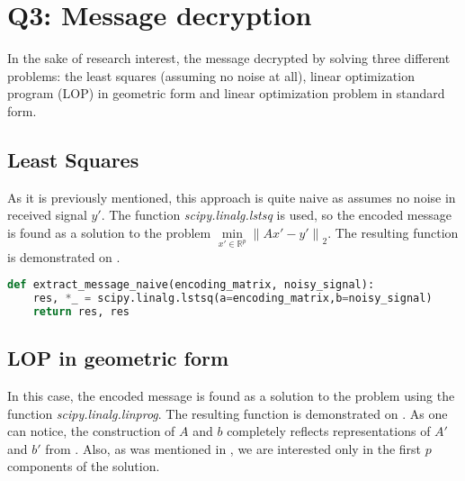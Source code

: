 \documentclass{article}
\def\R{\mathbb{R}}
\begin{document}

\section{Q3: Message decryption}

In the sake of research interest, the message decrypted by solving three different problems: the least squares (assuming no noise at all), linear optimization program (LOP) in geometric form and linear optimization problem in standard form.

\subsection{Least Squares}
As it is previously mentioned, this approach is quite naive as assumes no noise in received signal $y'$. The function \textit{scipy.linalg.lstsq} is used, so the encoded message is found as a solution to the problem $\min\limits_{x' \in \R^p} {\| Ax'-y' \|}_2$. The resulting function is demonstrated on .

\begin{lstlisting}[language=Python, caption={Naive message decryption. The output is tuple of solution of the problem, and decrypted message itself}, label={lst:naive}]
  def extract_message_naive(encoding_matrix, noisy_signal):
    res, *_ = scipy.linalg.lstsq(a=encoding_matrix,b=noisy_signal)
    return res, res
\end{lstlisting}


\subsection{LOP in geometric form}
In this case, the encoded message is found as a solution to the problem  using the function \textit{scipy.linalg.linprog}. The resulting function is demonstrated on . As one can notice, the construction of $A$ and $b$ completely reflects representations of $A'$ and $b'$ from . Also, as was mentioned in , we are interested only in the first $p$ components of the solution.
\end{document}
